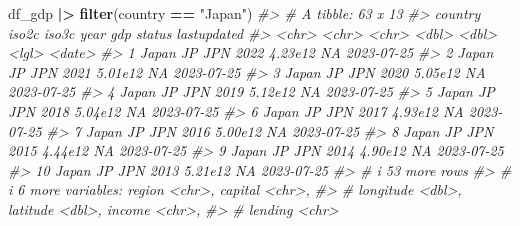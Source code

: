 \documentclass[
  xelatex, ja=standard]{bxjsbook}
\newenvironment{Shaded}{\begin{snugshade}}{\end{snugshade}}
\newcommand{\CommentTok}[1]{\textcolor[rgb]{0.56,0.35,0.01}{\textit{#1}}}
\newcommand{\FunctionTok}[1]{\textcolor[rgb]{0.13,0.29,0.53}{\textbf{#1}}}
\newcommand{\NormalTok}[1]{#1}
\newcommand{\SpecialCharTok}[1]{\textcolor[rgb]{0.81,0.36,0.00}{\textbf{#1}}}
\newcommand{\StringTok}[1]{\textcolor[rgb]{0.31,0.60,0.02}{#1}}
\theoremstyle{definition}
\theoremstyle{definition}
\theoremstyle{definition}
\theoremstyle{definition}
\theoremstyle{remark}
\begin{document}
\begin{Shaded}
\begin{Highlighting}[]
\NormalTok{df\_gdp }\SpecialCharTok{|\textgreater{}} \FunctionTok{filter}\NormalTok{(country }\SpecialCharTok{==} \StringTok{"Japan"}\NormalTok{)}
\CommentTok{\#\textgreater{} \# A tibble: 63 x 13}
\CommentTok{\#\textgreater{}    country iso2c iso3c  year     gdp status lastupdated}
\CommentTok{\#\textgreater{}    \textless{}chr\textgreater{}   \textless{}chr\textgreater{} \textless{}chr\textgreater{} \textless{}dbl\textgreater{}   \textless{}dbl\textgreater{} \textless{}lgl\textgreater{}  \textless{}date\textgreater{}     }
\CommentTok{\#\textgreater{}  1 Japan   JP    JPN    2022 4.23e12 NA     2023{-}07{-}25 }
\CommentTok{\#\textgreater{}  2 Japan   JP    JPN    2021 5.01e12 NA     2023{-}07{-}25 }
\CommentTok{\#\textgreater{}  3 Japan   JP    JPN    2020 5.05e12 NA     2023{-}07{-}25 }
\CommentTok{\#\textgreater{}  4 Japan   JP    JPN    2019 5.12e12 NA     2023{-}07{-}25 }
\CommentTok{\#\textgreater{}  5 Japan   JP    JPN    2018 5.04e12 NA     2023{-}07{-}25 }
\CommentTok{\#\textgreater{}  6 Japan   JP    JPN    2017 4.93e12 NA     2023{-}07{-}25 }
\CommentTok{\#\textgreater{}  7 Japan   JP    JPN    2016 5.00e12 NA     2023{-}07{-}25 }
\CommentTok{\#\textgreater{}  8 Japan   JP    JPN    2015 4.44e12 NA     2023{-}07{-}25 }
\CommentTok{\#\textgreater{}  9 Japan   JP    JPN    2014 4.90e12 NA     2023{-}07{-}25 }
\CommentTok{\#\textgreater{} 10 Japan   JP    JPN    2013 5.21e12 NA     2023{-}07{-}25 }
\CommentTok{\#\textgreater{} \# i 53 more rows}
\CommentTok{\#\textgreater{} \# i 6 more variables: region \textless{}chr\textgreater{}, capital \textless{}chr\textgreater{},}
\CommentTok{\#\textgreater{} \#   longitude \textless{}dbl\textgreater{}, latitude \textless{}dbl\textgreater{}, income \textless{}chr\textgreater{},}
\CommentTok{\#\textgreater{} \#   lending \textless{}chr\textgreater{}}
\end{Highlighting}
\end{Shaded}
\end{document}
